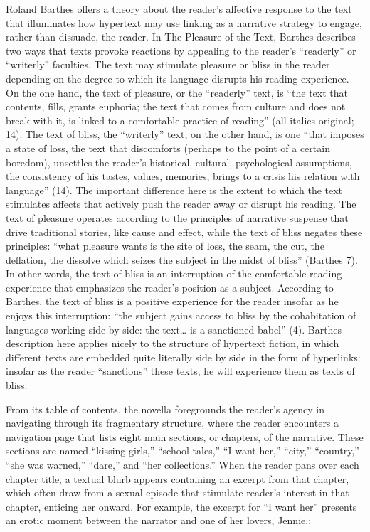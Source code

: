 \documentclass[11pt]{article}
\begin{document}
Roland Barthes offers a theory about the reader’s affective response
to the text that illuminates how hypertext may use linking as a
narrative strategy to engage, rather than dissuade, the reader. In The
Pleasure of the Text, Barthes describes two ways that texts provoke
reactions by appealing to the reader’s “readerly” or “writerly”
faculties. The text may stimulate pleasure or bliss in the reader
depending on the degree to which its language disrupts his reading
experience. On the one hand, the text of pleasure, or the “readerly”
text, is “the text that contents, fills, grants euphoria; the text
that comes from culture and does not break with it, is linked to a
comfortable practice of reading” (all italics original; 14).  The text
of bliss, the “writerly” text, on the other hand, is one “that imposes
a state of loss, the text that discomforts (perhaps to the point of a
certain boredom), unsettles the reader’s historical, cultural,
psychological assumptions, the consistency of his tastes, values,
memories, brings to a crisis his relation with language” (14). The
important difference here is the extent to which the text stimulates
affects that actively push the reader away or disrupt his reading. The
text of pleasure operates according to the principles of narrative
suspense that drive traditional stories, like cause and effect, while
the text of bliss negates these principles: “what pleasure wants is
the site of loss, the seam, the cut, the deflation, the dissolve which
seizes the subject in the midst of bliss” (Barthes 7). In other words,
the text of bliss is an interruption of the comfortable reading
experience that emphasizes the reader’s position as a
subject. According to Barthes, the text of bliss is a positive
experience for the reader insofar as he enjoys this interruption: “the
subject gains access to bliss by the cohabitation of languages working
side by side: the text… is a sanctioned babel” (4). Barthes
description here applies nicely to the structure of hypertext fiction,
in which different texts are embedded quite literally side by side in
the form of hyperlinks: insofar as the reader “sanctions” these texts,
he will experience them as texts of bliss.

 From its table of contents, the novella foregrounds the reader’s
agency in navigating through its fragmentary structure, where the
reader encounters a navigation page that lists eight main sections, or
chapters, of the narrative. These sections are named “kissing girls,”
“school tales,” “I want her,” “city,” “country,” “she was warned,”
“dare,” and “her collections.” When the reader pans over each chapter
title, a textual blurb appears containing an excerpt from that
chapter, which often draw from a sexual episode that stimulate
reader's interest in that chapter, enticing her onward. For example,
the excerpt for “I want her” presents an erotic moment between the
narrator and one of her lovers, Jennie.:
\end{document}

